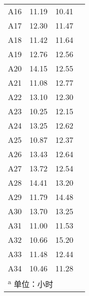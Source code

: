 \documentclass[cn, 11pt, fancy, hide]{elegantbook}
\begin{document}
\begin{table}[!h]
\begin{tabular}{lccc}
A16 & 11.19 & 10.41 & \multicolumn{1}{r}{\cellcolor[HTML]{db735c}{\textcolor{black}{0.78}}}\\
\rowcolor{gray!6}  A17 & 12.30 & 11.47 & \multicolumn{1}{r}{\cellcolor[HTML]{db735c}{\textcolor{black}{0.83}}}\\
A18 & 11.42 & 11.64 & \multicolumn{1}{r}{\cellcolor[HTML]{F3C57B}{\textcolor{black}{-0.21}}}\\
\rowcolor{gray!6}  A19 & 12.76 & 12.56 & \multicolumn{1}{r}{\cellcolor[HTML]{db735c}{\textcolor{black}{0.2}}}\\
A20 & 14.15 & 12.55 & \multicolumn{1}{r}{\cellcolor[HTML]{db735c}{\textcolor{black}{1.59}}}\\
\rowcolor{gray!6}  A21 & 11.08 & 12.77 & \multicolumn{1}{r}{\cellcolor[HTML]{F3C57B}{\textcolor{black}{-1.68}}}\\
A22 & 13.10 & 12.30 & \multicolumn{1}{r}{\cellcolor[HTML]{db735c}{\textcolor{black}{0.81}}}\\
\rowcolor{gray!6}  A23 & 10.25 & 12.15 & \multicolumn{1}{r}{\cellcolor[HTML]{F3C57B}{\textcolor{black}{-1.91}}}\\
A24 & 13.25 & 12.62 & \multicolumn{1}{r}{\cellcolor[HTML]{db735c}{\textcolor{black}{0.63}}}\\
\rowcolor{gray!6}  A25 & 10.87 & 12.37 & \multicolumn{1}{r}{\cellcolor[HTML]{F3C57B}{\textcolor{black}{-1.5}}}\\
A26 & 13.43 & 12.64 & \multicolumn{1}{r}{\cellcolor[HTML]{db735c}{\textcolor{black}{0.79}}}\\
\rowcolor{gray!6}  A27 & 13.72 & 12.54 & \multicolumn{1}{r}{\cellcolor[HTML]{db735c}{\textcolor{black}{1.18}}}\\
A28 & 14.41 & 13.20 & \multicolumn{1}{r}{\cellcolor[HTML]{db735c}{\textcolor{black}{1.21}}}\\
\rowcolor{gray!6}  A29 & 11.79 & 14.48 & \multicolumn{1}{r}{\cellcolor[HTML]{F3C57B}{\textcolor{black}{-2.68}}}\\
A30 & 13.70 & 13.25 & \multicolumn{1}{r}{\cellcolor[HTML]{db735c}{\textcolor{black}{0.46}}}\\
\rowcolor{gray!6}  A31 & 11.00 & 11.53 & \multicolumn{1}{r}{\cellcolor[HTML]{F3C57B}{\textcolor{black}{-0.53}}}\\
A32 & 10.66 & 15.20 & \multicolumn{1}{r}{\cellcolor[HTML]{F3C57B}{\textcolor{black}{-4.54}}}\\
\rowcolor{gray!6}  A33 & 11.48 & 12.44 & \multicolumn{1}{r}{\cellcolor[HTML]{F3C57B}{\textcolor{black}{-0.95}}}\\
A34 & 10.46 & 11.28 & \multicolumn{1}{r}{\cellcolor[HTML]{F3C57B}{\textcolor{black}{-0.82}}}\\
\bottomrule
\multicolumn{4}{l}{\textsuperscript{a} 单位：小时}\\
\end{tabular}
\end{table}
\end{document}
